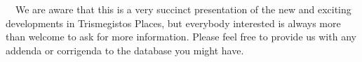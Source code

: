 \documentclass[amsthm,ebook]{saparticle}
\begin{document}
\ \ We are aware that this is a very succinct presentation of the new and exciting developments in Trismegistos Places,
but everybody interested is always more than welcome to ask for more information. Please feel free to provide us with
any addenda or corrigenda to the database you might have.


\end{document}
